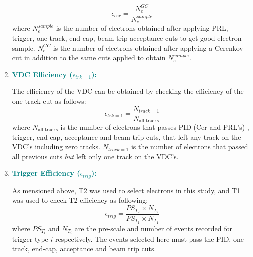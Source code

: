 \documentclass[11pt]{article}
\begin{document}
\begin{enumerate}
 
\begin{equation}
\epsilon_{cer}=\frac{N_{e}^{GC}}{N_{e}^{sample}}
\end{equation}
   where $N_{e}^{sample}$ is the number of electrons obtained after applying PRL, trigger, one-track, end-cap, beam trip acceptance cuts to get good electron sample. $N_{e}^{GC}$ is the number of electrons obtained after applying  a \~Cerenkov cut in addition to the same cuts applied to obtain  $N_{e}^{sample}$. 
\item{\textcolor{teal}{\textbf{VDC Efficiency ($\epsilon_{trk=1}$): }}}\par
 The efficiency of the VDC can be obtained by checking the efficiency of the one-track cut as follows: 
\begin{equation}
\epsilon_{trk=1}=\frac{N_{track=1}}{N_{\text{all tracks}}}
\end{equation}
where  $N_{\text{all tracks}}$ is the number of electrons that passes PID (Cer and PRL's) , trigger, end-cap, acceptance and beam trip cuts, that left any track on the VDC's including zero tracks. $N_{track=1}$ is the number of electrons that passed all previous cuts \emph{but} left only one track on the VDC's.
\item{\textcolor{teal}{\textbf{Trigger Efficiency ($\epsilon_{trig}$):}}}\par
As mensioned above, T2 was used to select electrons in this study, and T1 was used to check T2 efficiency as following:
 \begin{equation}
 \epsilon_{trig}=\frac{PS_{T_{2}}\times N_{T_{2}}}{PS_{T_{1}} \times N_{T_{1}}}
  \end{equation}
 where $PS_{T_{i}}$ and $N_{T_{i}}$ are the pre-scale and number of events recorded for trigger type $i$ respectively. The events selected here must pass the PID, one-track, end-cap, acceptance and beam trip cuts. 
  \end{enumerate}
\end{document}
